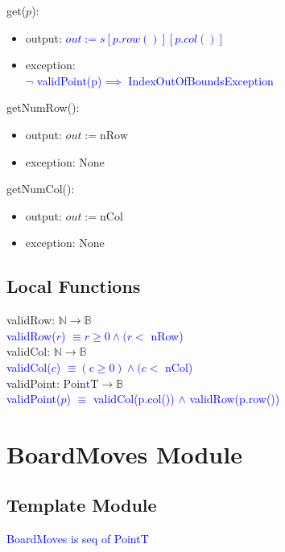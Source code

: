 \documentclass[12pt]{article}
\begin{document}
\noindent get($p$):
\begin{itemize}
\item output: \textcolor{blue}{$out := s[p.row()][p.col()]$}
\item exception:\\ \textcolor{blue}{$\lnot$ validPoint(p)$\implies$ IndexOutOfBoundsException}
\end{itemize}

\noindent getNumRow():
\begin{itemize}
\item output: $out := \mbox{nRow}$
\item exception: None
\end{itemize}

\noindent getNumCol():
\begin{itemize}
\item output: $out := \mbox{nCol}$
\item exception: None
\end{itemize}

\subsection*{Local Functions}

\noindent validRow: $\mathbb{N} \rightarrow \mathbb{B}$\\
\noindent \textcolor{blue}{validRow($r$) $\equiv r \geq 0 \land (r < $ nRow)} \\

\noindent validCol: $\mathbb{N} \rightarrow \mathbb{B}$\\
\noindent \textcolor{blue}{validCol($c$) $\equiv (c \geq 0) \land (c < $ nCol)} \\


\noindent validPoint: $\mbox{PointT} \rightarrow \mathbb{B}$\\
\noindent \textcolor{blue}{validPoint($p$) $\equiv$ validCol(p.col()) $\land$ validRow(p.row())}

\newpage

\section* {BoardMoves Module}

\subsection* {Template Module}

\noindent \textcolor{blue}{BoardMoves is seq of PointT}
\end{document}
